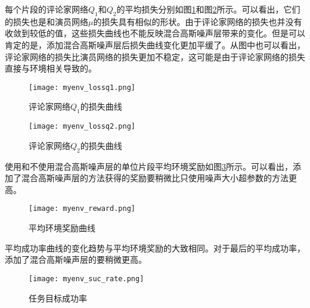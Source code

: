     每个片段的评论家网络$Q_1$和$Q_2$的平均损失分别如图\ref{fcn_lossq1}和图\ref{fcn_lossq2}所示。可以看出，它们的损失也是和演员网络$\mu$的损失具有相似的形状。由于评论家网络的损失也并没有收敛到较低的值，这些损失曲线也不能反映混合高斯噪声层带来的变化。但是可以肯定的是，添加混合高斯噪声层后损失曲线变化更加平缓了。从图中也可以看出，评论家网络的损失比演员网络的损失更加不稳定，这可能是由于评论家网络的损失直接与环境相关导致的。

        \begin{figure}
        \centering
        \texttt{[image: myenv\_lossq1.png]}
        \caption{评论家网络$Q_1$的损失曲线}
            \label{fcn_lossq1}
        \end{figure}

        \begin{figure}
        \centering
        \texttt{[image: myenv\_lossq2.png]}
        \caption{评论家网络$Q_2$的损失曲线}
            \label{fcn_lossq2}
        \end{figure}

        使用和不使用混合高斯噪声层的单位片段平均环境奖励如图\ref{fcn_reward}所示。可以看出，添加了混合高斯噪声层的方法获得的奖励要稍微比只使用噪声大小超参数的方法更高。

        \begin{figure}
        \centering
        \texttt{[image: myenv\_reward.png]}
        \caption{平均环境奖励曲线}
            \label{fcn_reward}
        \end{figure}

        平均成功率曲线的变化趋势与平均环境奖励的大致相同。对于最后的平均成功率，添加了混合高斯噪声层的要稍微更高。

        \begin{figure}
        \centering
        \texttt{[image: myenv\_suc\_rate.png]}
        \caption{任务目标成功率}
            \label{fcn_suc_rate}
        \end{figure}

